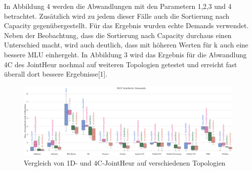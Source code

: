 \documentclass[sigconf,noacm,review]{acmart}
\begin{document}
In Abbildung 4 werden die Abwandlungen mit den Parametern 1,2,3 und 4 betrachtet. Zusätzlich wird zu jedem dieser Fälle auch die Sortierung nach Capacity gegenübergestellt. Für das Ergebnis wurden echte Demands verwendet. Neben der Beobachtung, dass die Sortierung nach Capacity durchaus einen Unterschied macht, wird auch deutlich, dass mit höheren Werten für k auch eine bessere MLU einhergeht. In Abbildung 3 wird das Ergebnis für die Abwandlung 4C des JointHeur nochmal auf weiteren Topologien getestet und erreicht fast überall dort bessere Ergebnisse[1].
\begin{figure}[h]
  \centering 
  \includegraphics[width=\linewidth]{abbildungen/PNG-Bild 3}
  \caption{Vergleich von 1D- und 4C-JointHeur auf verschiedenen Topologien}
\end{figure}
\end{document}
